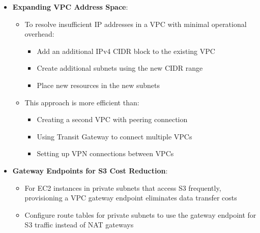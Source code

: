 \documentclass[11pt,a4paper]{report}
\begin{document}
\begin{itemize}
\begin{itemize}
  \item For connecting two VPCs in the same region within the same AWS account, VPC peering is the most cost-effective solution
  \item VPC peering provides direct network connectivity that enables inter-VPC communication with minimal operational overhead
  \item More cost-effective than Transit Gateway for simpler networking scenarios with moderate data transfer (e.g., 500 GB monthly)
  \item Simpler than Site-to-Site VPN which introduces unnecessary complexity and additional costs
  \item Not suited for Direct Connect which is designed for connecting on-premises networks to AWS
  \item Requires updating route tables in each VPC to use the peering connection for inter-VPC communication
\end{itemize}
  \item \textbf{Expanding VPC Address Space}:
\begin{itemize}
  \item To resolve insufficient IP addresses in a VPC with minimal operational overhead:
\begin{itemize}
  \item Add an additional IPv4 CIDR block to the existing VPC
  \item Create additional subnets using the new CIDR range
  \item Place new resources in the new subnets
\end{itemize}
  \item This approach is more efficient than:
\begin{itemize}
  \item Creating a second VPC with peering connection
  \item Using Transit Gateway to connect multiple VPCs
  \item Setting up VPN connections between VPCs
\end{itemize}
\end{itemize}
  \item \textbf{Gateway Endpoints for S3 Cost Reduction}:
\begin{itemize}
  \item For EC2 instances in private subnets that access S3 frequently, provisioning a VPC gateway endpoint eliminates data transfer costs
  \item Configure route tables for private subnets to use the gateway endpoint for S3 traffic instead of NAT gateways

\end{itemize}
\end{itemize}
\end{document}
